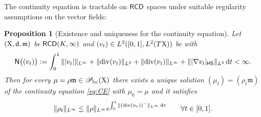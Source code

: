 \documentclass[11pt]{article}
\numberwithin{equation}{section}
\newtheorem{proposition}[theorem]{Proposition}
\newcommand{\pr}{\mathscr P}
\newcommand{\X}{{\rm X}}
\newcommand{\sfd}{{\sf d}}
\newcommand{\mm}{{\mathfrak m}}
\newcommand{\RCD}{{\sf RCD}}
\renewcommand{\d}{{\rm d}}
\renewcommand{\div}{{\rm div}}
\newcommand{\bc}{{\rm bc}}
\newcommand{\HS}{\sf HS}
\begin{document}
The continuity equation is tractable on $\RCD$ spaces under suitable regularity assumptions on the vector fields:
\begin{proposition}[Existence and uniqueness for the continuity equation]\label{prop:exuniqCE} Let $(\X,\sfd,\mm)$ be $\RCD(K,\infty)$ and $(v_t)\in L^2([0,1],L^2(T\X))$ be with
\begin{equation}
\label{eq:assvt}
{\sf N}\big((v_t)\big):=\int_0^1\||v_t|\|_{L^\infty}+\|\div( v_t)\|_{L^2}+\|\div (v_t)\|_{L^\infty}+\||\nabla v_t|_{\HS}\|_{L^2}\,\d t<\infty.
\end{equation}
Then for every $\mu=\rho\mm\in\pr_\bc(\X)$ there exists a unique solution $(\mu_t)=(\rho_t\mm)$ of the continuity equation \eqref{eq:CE} with $\mu_0=\mu$ and it satisfies
\begin{equation}
\label{eq:expb}
\|\rho_t\|_{L^\infty}\leq \|\rho\|_{L^\infty}e^{\int_0^t\|(\div(v_r))^-\|_{L^\infty}\,\d r}\qquad\forall t\in[0,1].
\end{equation}
\end{proposition}
\end{document}

